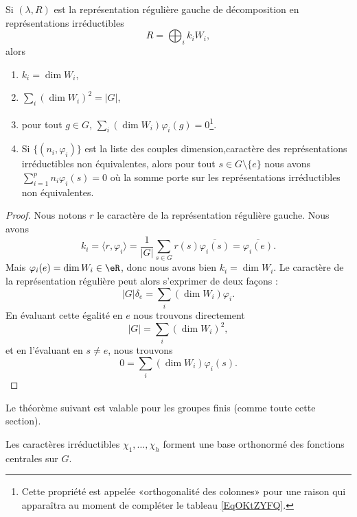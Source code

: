 \begin{proposition} \label{PropYLnxIjk}
	Si \( (\lambda,R)\) est la représentation régulière gauche de décomposition en représentations irréductibles
	\begin{equation}
		R=\bigoplus_ik_iW_i,
	\end{equation}
	alors
	\begin{enumerate}
		\item
		      \( k_i=\dim W_i\),
		\item       \label{ITEMooLXIJooDxkGJh}
		      \( \sum_i(\dim W_i)^2=|G|\),
		\item   \label{ItemEXAjTIh}
		      pour tout \( g\in G\), \( \sum_i(\dim W_i)\varphi_i(g)=0\)\footnote{Cette propriété est appelée «orthogonalité des colonnes» pour une raison qui apparaîtra au moment de compléter le tableau \eqref{EqOKtZYFQ}.}.
		\item
		      Si \( \{ (n_i,\varphi_i) \}\) est la liste des couples dimension,caractère des représentations irréductibles non équivalentes, alors pour tout \( s\in G\setminus\{ e \}\) nous avons \( \sum_{i=1}^pn_i\varphi_i(s)=0\) où la somme porte sur les représentations irréductibles non équivalentes.
	\end{enumerate}
\end{proposition}

\begin{proof}
	Nous notons \( r\) le caractère de la représentation régulière gauche. Nous avons
	\begin{equation}
		k_i=\langle r, \varphi_i\rangle =\frac{1}{ | G | }\sum_{s\in G}r(s)\overline{ \varphi_i(s) }=\overline{ \varphi_i(e) }.
	\end{equation}
	Mais \( \varphi_i(e)=\dim W_i\in \eR\), donc nous avons bien \( k_i=\dim W_i\). Le caractère de la représentation régulière peut alors s'exprimer de deux façons :
	\begin{equation}
		| G |\delta_e=\sum_i(\dim W_i)\varphi_i.
	\end{equation}
	En évaluant cette égalité en \( e\) nous trouvons directement
	\begin{equation}
		| G |=\sum_i(\dim W_i)^2,
	\end{equation}
	et en l'évaluant en \( s\neq e\), nous trouvons
	\begin{equation}
		0=\sum_i(\dim W_i)\varphi_i(s).
	\end{equation}
\end{proof}

Le théorème suivant est valable pour les groupes finis (comme toute cette section).
\begin{theorem}  \label{Thogocemg}
	Les caractères irréductibles \( \chi_1,\ldots, \chi_h\) forment une base orthonormé des fonctions centrales sur \( G\).
\end{theorem}

